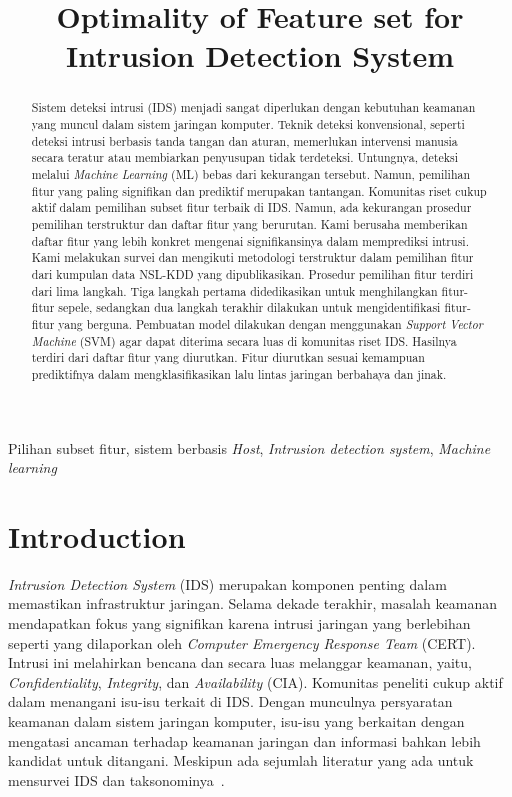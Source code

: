 \documentclass[conference]{IEEEtran}
\title{Optimality of Feature set for Intrusion Detection System}
\author{\IEEEauthorblockN{Studen1t\IEEEauthorrefmark{1}, Studen1t\IEEEauthorrefmark{2}, Studen1t\IEEEauthorrefmark{3}}
\IEEEauthorblockA{\textit{School of Electrical Engineering and Informatics}\\
\textit{Institut Teknologi Bandug}\\
Bandung, Indonesia\\
Email: \{\IEEEauthorrefmark{1}132xxx, \IEEEauthorrefmark{2}132xxx, \IEEEauthorrefmark{3}132xxx\}@students.itb.ac.id}}
\begin{document}
\maketitle

\begin{abstract}
    Sistem deteksi intrusi (IDS) menjadi sangat diperlukan dengan kebutuhan keamanan yang muncul dalam sistem jaringan komputer. Teknik deteksi konvensional, seperti deteksi intrusi berbasis tanda tangan dan aturan, memerlukan intervensi manusia secara teratur atau membiarkan penyusupan tidak terdeteksi. Untungnya, deteksi melalui \emph{Machine Learning} (ML) bebas dari kekurangan tersebut. Namun, pemilihan fitur yang paling signifikan dan prediktif merupakan tantangan. Komunitas riset cukup aktif dalam pemilihan subset fitur terbaik di IDS. Namun, ada kekurangan prosedur pemilihan terstruktur dan daftar fitur yang berurutan. Kami berusaha memberikan daftar fitur yang lebih konkret mengenai signifikansinya dalam memprediksi intrusi. Kami melakukan survei dan mengikuti metodologi terstruktur dalam pemilihan fitur dari kumpulan data NSL-KDD yang dipublikasikan. Prosedur pemilihan fitur terdiri dari lima langkah. Tiga langkah pertama didedikasikan untuk menghilangkan fitur-fitur sepele, sedangkan dua langkah terakhir dilakukan untuk mengidentifikasi fitur-fitur yang berguna. Pembuatan model dilakukan dengan menggunakan \emph{Support Vector Machine} (SVM) agar dapat diterima secara luas di komunitas riset IDS. Hasilnya terdiri dari daftar fitur yang diurutkan. Fitur diurutkan sesuai kemampuan prediktifnya dalam mengklasifikasikan lalu lintas jaringan berbahaya dan jinak.
\end{abstract}

\begin{IEEEkeywords}
    Pilihan subset fitur, sistem berbasis \emph{Host}, \emph{Intrusion detection system}, \emph{Machine learning}
\end{IEEEkeywords}

\section{Introduction}

\emph{Intrusion Detection System} (IDS) merupakan komponen penting dalam memastikan infrastruktur jaringan. Selama dekade terakhir, masalah keamanan mendapatkan fokus yang signifikan karena intrusi jaringan yang berlebihan seperti yang dilaporkan oleh \emph{Computer Emergency Response Team} (CERT). Intrusi ini melahirkan bencana dan secara luas melanggar keamanan, yaitu, \emph{Confidentiality}, \emph{Integrity}, dan \emph{Availability} (CIA). Komunitas peneliti cukup aktif dalam menangani isu-isu terkait di IDS. Dengan munculnya persyaratan keamanan dalam sistem jaringan komputer, isu-isu yang berkaitan dengan mengatasi ancaman terhadap keamanan jaringan dan informasi bahkan lebih kandidat untuk ditangani. Meskipun ada sejumlah literatur yang ada untuk mensurvei IDS dan taksonominya~\cite{soni2015survey, denning1987intrusion, lunt1993survey, mukherjee1994network, xie2011anomaly, garcia2009anomaly}.
\end{document}
